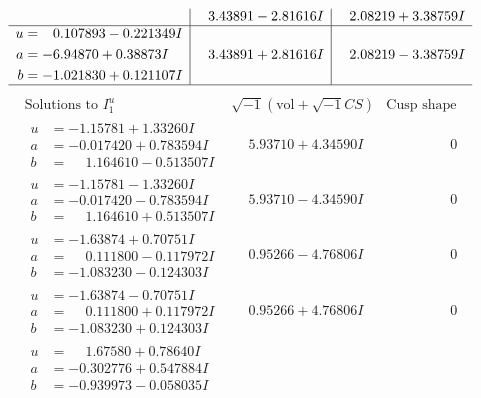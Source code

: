 \documentclass[1p]{elsarticle_modified}
\theoremstyle{definition}
\newcommand{\I}{\sqrt{-1}}
\begin{document}
$$\begin{array}{c|c|c}
 & \phantom{-}3.43891 - 2.81616 I & \phantom{-}2.08219 + 3.38759 I \\ \hline\begin{aligned}
u &= \phantom{-}0.107893 - 0.221349 I \\
a &= -6.94870 + 0.38873 I \\
b &= -1.021830 + 0.121107 I\end{aligned}
 & \phantom{-}3.43891 + 2.81616 I & \phantom{-}2.08219 - 3.38759 I\\
 \hline 
 \end{array}$$\newpage$$\begin{array}{c|c|c}  
\text{Solutions to }I^u_{1}& \I (\text{vol} + \sqrt{-1}CS) & \text{Cusp shape}\\
 \hline 
\begin{aligned}
u &= -1.15781 + 1.33260 I \\
a &= -0.017420 + 0.783594 I \\
b &= \phantom{-}1.164610 - 0.513507 I\end{aligned}
 & \phantom{-}5.93710 + 4.34590 I & \phantom{-0.000000 } 0 \\ \hline\begin{aligned}
u &= -1.15781 - 1.33260 I \\
a &= -0.017420 - 0.783594 I \\
b &= \phantom{-}1.164610 + 0.513507 I\end{aligned}
 & \phantom{-}5.93710 - 4.34590 I & \phantom{-0.000000 } 0 \\ \hline\begin{aligned}
u &= -1.63874 + 0.70751 I \\
a &= \phantom{-}0.111800 - 0.117972 I \\
b &= -1.083230 - 0.124303 I\end{aligned}
 & \phantom{-}0.95266 - 4.76806 I & \phantom{-0.000000 } 0 \\ \hline\begin{aligned}
u &= -1.63874 - 0.70751 I \\
a &= \phantom{-}0.111800 + 0.117972 I \\
b &= -1.083230 + 0.124303 I\end{aligned}
 & \phantom{-}0.95266 + 4.76806 I & \phantom{-0.000000 } 0 \\ \hline\begin{aligned}
u &= \phantom{-}1.67580 + 0.78640 I \\
a &= -0.302776 + 0.547884 I \\
b &= -0.939973 - 0.058035 I\end{aligned}

\end{array}$$
\end{document}
